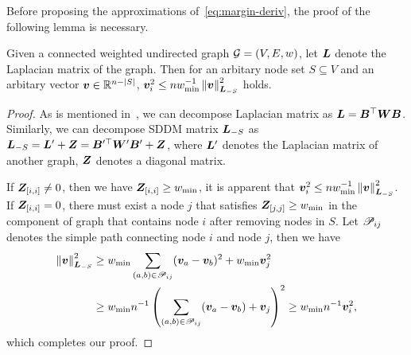 \documentclass[sigconf]{acmart}
\begin{document}
Before proposing the approximations of~\eqref{eq:margin-deriv}, the proof of the following lemma is necessary.
\begin{lemma}\label{lem:norm-ineq}
    Given a connected weighted undirected graph \(\mathcal{G}=(V,E,w)\), let \(\boldsymbol{L}\) denote the Laplacian matrix of the graph.
    Then for an arbitary node set \(S\subseteq V\) and an arbitary vector \(\boldsymbol{v}\in\mathbb{R}^{n-\left|S \right|}\), \(\boldsymbol{v}_i^2\le nw_{\min}^{-1}\left\Vert\boldsymbol{v}\right\Vert^2_{\boldsymbol{L}_{-S}}\) holds.
\end{lemma}

\begin{proof}
    As is mentioned in~, we can decompose Laplacian matrix as \(\boldsymbol{L}=\boldsymbol{B}^\top\boldsymbol{W}\boldsymbol{B}\).
    Similarly, we can decompose SDDM matrix \(\boldsymbol{L}_{-S}\) as \(\boldsymbol{L}_{-S}=\boldsymbol{L}'+\boldsymbol{Z}=\boldsymbol{B}'^\top\boldsymbol{W}'\boldsymbol{B}'+\boldsymbol{Z}\), where \(\boldsymbol{L}'\) denotes the Laplacian matrix of another graph, \(\boldsymbol{Z}\) denotes a diagonal matrix.

    If \(\boldsymbol{Z}_{[i,i]}\neq0\), then we have \(\boldsymbol{Z}_{[i,i]}\ge w_{\min}\), it is apparent that \(\boldsymbol{v}_i^2\le nw_{\min}^{-1}\left\Vert\boldsymbol{v}\right\Vert^2_{\boldsymbol{L}_{-S}}\).
    If \(\boldsymbol{Z}_{[i,i]}=0\), there must exist a node \(j\) that satisfies \(\boldsymbol{Z}_{[j,j]}\ge w_{\min}\) in the component of graph that contains node \(i\) after removing nodes in \(S\).
    Let \(\mathscr{P}_{ij}\) denotes the simple path connecting node \(i\) and node \(j\), then we have
    \begin{align*}
        \left\Vert\boldsymbol{v}\right\Vert^2_{\boldsymbol{L}_{-S}}
         & \ge w_{\min}\sum_{\left( a,b \right)\in\mathscr{P}_{ij}}(\boldsymbol{v}_a-\boldsymbol{v}_b)^2+w_{\min}\boldsymbol{v}_j^2     \\
         & \ge w_{\min}n^{-1}\left( \sum_{\left( a,b \right)\in\mathscr{P}_{ij}}(\boldsymbol{v}_a-\boldsymbol{v}_b)+\boldsymbol{v}_j \right)^2
        \ge w_{\min}n^{-1}\boldsymbol{v}_i^2,
    \end{align*}
    which completes our proof.
\end{proof}
\end{document}
